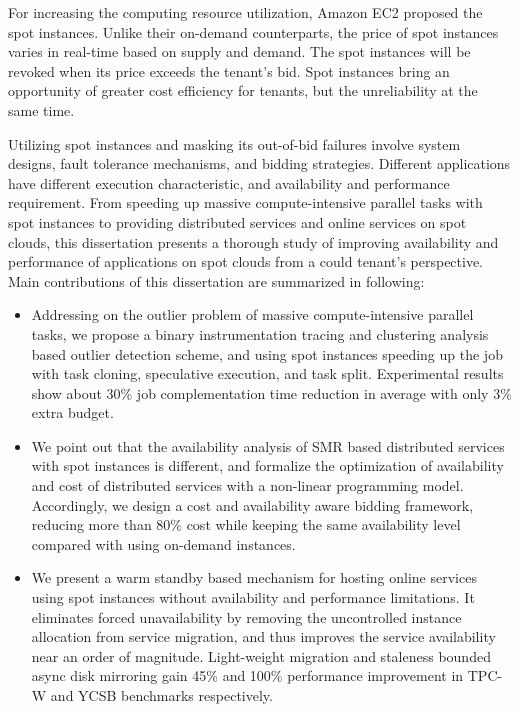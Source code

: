 \begin{eabstract}
   
   For increasing the computing resource utilization, Amazon EC2 proposed the 
   spot instances. Unlike their on-demand counterparts, the price of spot instances 
   varies in real-time based on supply and demand. The spot instances will be revoked 
   when its price exceeds the tenant's bid. Spot instances bring an opportunity 
   of greater cost efficiency for tenants, but the unreliability at the same time.

   Utilizing spot instances and masking its out-of-bid failures involve 
   system designs, fault tolerance mechanisms, and bidding strategies. Different 
   applications have different execution characteristic, and availability and 
   performance requirement. From speeding up massive compute-intensive parallel tasks 
   with spot instances to providing distributed services and online services on spot 
   clouds, this dissertation presents a thorough study of improving availability and 
   performance of applications on spot clouds from a could tenant's perspective. Main 
   contributions of this dissertation are summarized in following: 

  \begin{itemize}
    \item Addressing on the outlier problem of massive compute-intensive parallel tasks, 
    we propose a binary instrumentation tracing and clustering analysis based outlier 
    detection scheme, and using spot instances speeding up the job with task cloning, 
    speculative execution, and task split. Experimental results show about 30\% job 
    complementation time reduction in average with only 3\% extra budget.
    \item We point out that the availability analysis of SMR based distributed services 
    with spot instances is different, and formalize the optimization of availability and 
    cost of distributed services with a non-linear programming model. Accordingly, we 
    design a cost and availability aware bidding framework, reducing more than 80\% cost 
    while keeping the same availability level compared with using on-demand instances.
    \item We present a warm standby based mechanism for hosting online services using 
    spot instances without availability and performance limitations. It eliminates forced 
    unavailability by removing the uncontrolled instance allocation from service migration, 
    and thus improves the service availability near an order of magnitude. Light-weight 
    migration and staleness bounded async disk mirroring gain 45\% and 100\% performance 
    improvement in TPC-W and YCSB benchmarks respectively.
  \end{itemize}

\end{eabstract}

